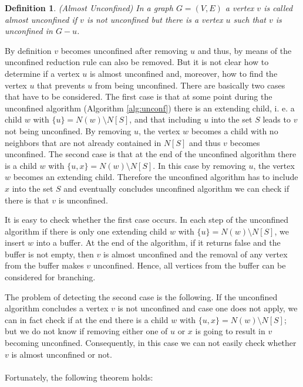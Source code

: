 \documentclass[]{article}
\newtheorem{definition}{Definition}
\begin{document}
\begin{definition} (Almost Unconfined)
	In a graph $G=(V,E)$ a vertex $v$ is called almost unconfined if $v$ is not unconfined but there is a vertex $u$ such that $v$ is unconfined in $G-u$.
\end{definition}

By definition $v$ becomes unconfined after removing $u$ and thus, by means of the unconfined reduction rule can also be removed. But it is not clear how to determine if a vertex $u$ is almost unconfined and, moreover, how to find the vertex $u$ that prevents $u$ from being unconfined. There are basically two cases that have to be considered. The first case is that at some point during the unconfined algorithm (Algorithm \ref{alg:unconf}) there is an extending child, i. e. a child $w$ with $\{u\} = N(w) \setminus N[S]$, and that including $u$ into the set $S$ leads to $v$ not being unconfined. By removing $u$, the vertex $w$ becomes a child with no neighbors that are not already contained in $N[S]$ and thus $v$ becomes unconfined. The second case is that at the end of the unconfined algorithm there is a child $w$ with $\{u,x\} = N(w) \setminus N[S]$. In this case by removing $u$, the vertex $w$ becomes an extending child. Therefore the unconfined algorithm has to include $x$ into the set $S$ and eventually concludes unconfined algorithm we can check if there is  that $v$ is unconfined. 

It is easy to check whether the first case occurs. In each step of the unconfined algorithm if there is only one extending child $w$ with $\{u\} = N(w) \setminus N[S]$, we insert $w$ into a buffer. At the end of the algorithm, if it returns false and the buffer is not empty, then $v$ is almost unconfined and the removal of any vertex from the buffer makes $v$ unconfined. Hence, all vertices from the buffer can be considered for branching.

The problem of detecting the second case is the following. If the unconfined algorithm concludes a vertex $v$ is not unconfined and case one does not apply, we can in fact check if at the end there is a child $w$ with $\{u,x\} = N(w) \setminus N[S]$; but we do not know if removing either one of $u$ or $x$ is going to result in $v$ becoming unconfined. Consequently, in this case we can not easily check whether $v$ is almost unconfined or not.

\paragraph{}
Fortunately, the following theorem holds:
\end{document}
